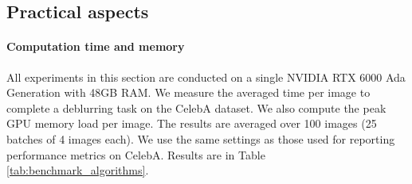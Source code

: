 \documentclass{article} %
\theoremstyle{definition}
\begin{document}
\newpage


\subsection{Practical aspects }
\paragraph{Computation time and memory}
\begin{table}
\vspace{-30pt}
     \caption{Time and memory metrics per image on the deblurring task on CelebA ($128\times 128$).}
        \label{tab:benchmark_algorithms}
        \centering        
\end{table}
All experiments in this section are conducted on a single NVIDIA RTX 6000 Ada Generation with 48GB RAM. 
We measure the averaged time per image to complete a deblurring task on the CelebA dataset. We also compute the peak GPU memory load per image. 
The results are averaged over 100 images (25 batches of 4 images each). 
We use the same settings as those used for reporting performance metrics on CelebA.
Results are in Table \ref{tab:benchmark_algorithms}. 
\end{document}
